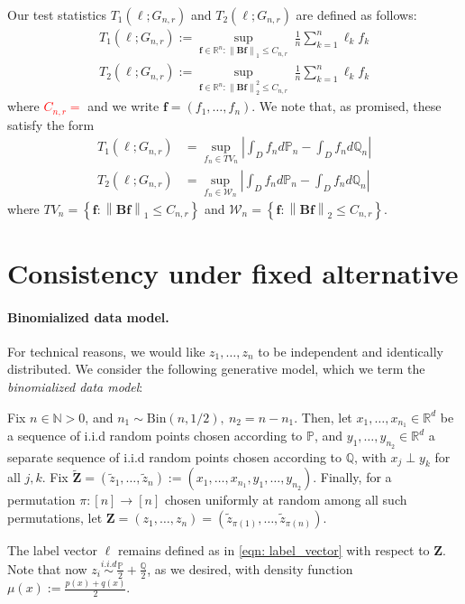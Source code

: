 \documentclass{article}
\newcommand{\Reals}{\mathbb{R}}
\newcommand{\norm}[1]{\left\lVert#1\right\rVert}
\newcommand{\abs}[1]{\left \lvert #1 \right \rvert}
\newcommand{\Bin}{\mathrm{Bin}}
\newcommand{\set}[1]{\left\{#1\right\}}
\newcommand{\Naturals}{\mathbb{N}}
\newcommand{\Rd}{\Reals^d}
\newcommand{\Zbf}{\mathbf{Z}}
\newcommand{\Bbf}{\mathbf{B}}
\newcommand{\lbf}{\bm{\ell}}
\newcommand{\fbf}{\mathbf{f}}
\newcommand{\Wset}{\mathcal{W}}
\newcommand{\Pbb}{\mathbb{P}}
\newcommand{\Qbb}{\mathbb{Q}}
\newcommand{\1}{\mathbf{1}}
\theoremstyle{alden}
\theoremstyle{aldenthm}
\theoremstyle{remark}
\begin{document}
Our test statistics $T_1(\lbf; G_{n,r})$ and $T_2(\lbf; G_{n,r})$ are defined as follows:
\begin{align*}
	T_1(\lbf; G_{n,r}) := \sup_{\fbf \in \Reals^n: \norm{\Bbf \fbf}_1 \leq C_{n,r}} ~ \frac{1}{n} \sum_{k = 1}^{n} \ell_k f_k \\
	T_2(\lbf; G_{n,r}) := \sup_{\fbf \in \Reals^n: \norm{\Bbf \fbf}_2^2 \leq C_{n,r}} ~ \frac{1}{n} \sum_{k = 1}^{n} \ell_k f_k
\end{align*}
where \textcolor{red}{$C_{n,r} = $} and we write $\fbf = (f_1,\ldots, f_n)$. We note that, as promised, these satisfy the form
\begin{align*}
T_1(\lbf; G_{n,r}) & = \sup_{f_n \in TV_n}\abs{\int_{D} f_n d\Pbb_n - \int_{D} f_n d\Qbb_n} \\
T_2(\lbf; G_{n,r}) & = \sup_{f_n \in \Wset_n}\abs{\int_{D} f_n d\Pbb_n - \int_{D} f_n d\Qbb_n}
\end{align*}
where $TV_n = \set{\fbf: \norm{\Bbf \fbf}_1 \leq C_{n,r}}$ and $\Wset_n = \set{\fbf: \norm{\Bbf \fbf}_2 \leq C_{n,r}}$.



\section{Consistency under fixed alternative}

\paragraph{Binomialized data model.}
For technical reasons, we would like $z_1, \ldots, z_n$ to be independent and identically distributed. We consider the following generative model, which we term the \emph{binomialized data model}: 

Fix $n \in \Naturals > 0$, and $n_1 \sim \Bin(n,1/2),~ n_2 = n - n_1$. Then, let $x_1, \ldots, x_{n_1} \in \Rd$ be a sequence of i.i.d random points chosen according to $\Pbb$, and $y_1, \ldots, y_{n_2} \in \Rd$ a separate sequence of i.i.d random points chosen according to $\Qbb$, with $x_j \perp y_k$ for all $j,k$. Fix $\widetilde{\Zbf} = (\widetilde{z}_1,\ldots,\widetilde{z}_n) := (x_1, \ldots, x_{n_1}, y_1, \ldots, y_{n_2})$.  Finally, for a permutation $\pi: [n] \to [n]$ chosen uniformly at random among all such permutations, let $\Zbf = (z_1,\ldots,z_n) =  (\widetilde{z}_{\pi(1)}, \ldots, \widetilde{z}_{\pi(n)})$. 

The label vector $\lbf$ remains defined as in \eqref{eqn: label_vector} with respect to $\Zbf$. Note that now $z_i \overset{i.i.d}{\sim} \frac{\Pbb}{2} + \frac{\Qbb}{2}$, as we desired, with density function $\mu(x) := \frac{p(x) + q(x)}{2}$.
\end{document}
